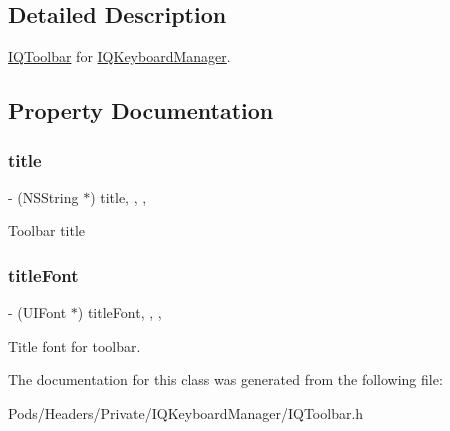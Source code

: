 \subsection{Detailed Description}
\mbox{\hyperlink{interface_i_q_toolbar}{I\+Q\+Toolbar}} for \mbox{\hyperlink{interface_i_q_keyboard_manager}{I\+Q\+Keyboard\+Manager}}. 

\subsection{Property Documentation}
\mbox{\label{interface_i_q_toolbar_aa7ef3850b96bedcda9fdab814a25c218}} 
\subsubsection{\texorpdfstring{title}{title}}
{\footnotesize\ttfamily -\/ (N\+S\+String $\ast$) title\hspace{0.3cm}{\ttfamily [read]}, {\ttfamily [write]}, {\ttfamily [nonatomic]}, {\ttfamily [strong]}}

Toolbar title \mbox{\label{interface_i_q_toolbar_a3148b64e99599e69ef16077edb0b324e}} 
\subsubsection{\texorpdfstring{title\+Font}{titleFont}}
{\footnotesize\ttfamily -\/ (U\+I\+Font $\ast$) title\+Font\hspace{0.3cm}{\ttfamily [read]}, {\ttfamily [write]}, {\ttfamily [nonatomic]}, {\ttfamily [strong]}}

Title font for toolbar. 

The documentation for this class was generated from the following file\+:\begin{DoxyCompactItemize}
\item 
Pods/\+Headers/\+Private/\+I\+Q\+Keyboard\+Manager/I\+Q\+Toolbar.\+h\end{DoxyCompactItemize}
